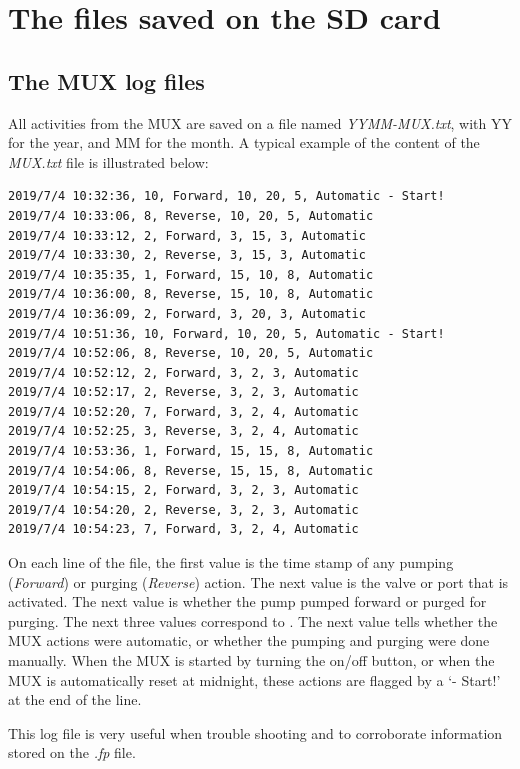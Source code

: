 \documentclass[]{book}
\begin{document}
\hypertarget{the-files-saved-on-the-sd-card}{%
\chapter{The files saved on the SD card}\label{the-files-saved-on-the-sd-card}}

\hypertarget{the-mux-log-files}{%
\section{The MUX log files}\label{the-mux-log-files}}

All activities from the MUX are saved on a file named \emph{YYMM-MUX.txt}, with YY for the year, and MM for the month. A typical example of the content of the \emph{MUX.txt} file is illustrated below:

\begin{verbatim}
2019/7/4 10:32:36, 10, Forward, 10, 20, 5, Automatic - Start!
2019/7/4 10:33:06, 8, Reverse, 10, 20, 5, Automatic
2019/7/4 10:33:12, 2, Forward, 3, 15, 3, Automatic
2019/7/4 10:33:30, 2, Reverse, 3, 15, 3, Automatic
2019/7/4 10:35:35, 1, Forward, 15, 10, 8, Automatic
2019/7/4 10:36:00, 8, Reverse, 15, 10, 8, Automatic
2019/7/4 10:36:09, 2, Forward, 3, 20, 3, Automatic
2019/7/4 10:51:36, 10, Forward, 10, 20, 5, Automatic - Start!
2019/7/4 10:52:06, 8, Reverse, 10, 20, 5, Automatic
2019/7/4 10:52:12, 2, Forward, 3, 2, 3, Automatic
2019/7/4 10:52:17, 2, Reverse, 3, 2, 3, Automatic
2019/7/4 10:52:20, 7, Forward, 3, 2, 4, Automatic
2019/7/4 10:52:25, 3, Reverse, 3, 2, 4, Automatic
2019/7/4 10:53:36, 1, Forward, 15, 15, 8, Automatic
2019/7/4 10:54:06, 8, Reverse, 15, 15, 8, Automatic
2019/7/4 10:54:15, 2, Forward, 3, 2, 3, Automatic
2019/7/4 10:54:20, 2, Reverse, 3, 2, 3, Automatic
2019/7/4 10:54:23, 7, Forward, 3, 2, 4, Automatic
\end{verbatim}

On each line of the file, the first value is the time stamp of any pumping (\emph{Forward}) or purging (\emph{Reverse}) action. The next value is the valve or port that is activated. The next value is whether the pump pumped forward or purged for purging. The next three values correspond to . The next value tells whether the MUX actions were automatic, or whether the pumping and purging were done manually. When the MUX is started by turning the on/off button, or when the MUX is automatically reset at midnight, these actions are flagged by a `- Start!' at the end of the line.

This log file is very useful when trouble shooting and to corroborate information stored on the \emph{.fp} file.
\end{document}
